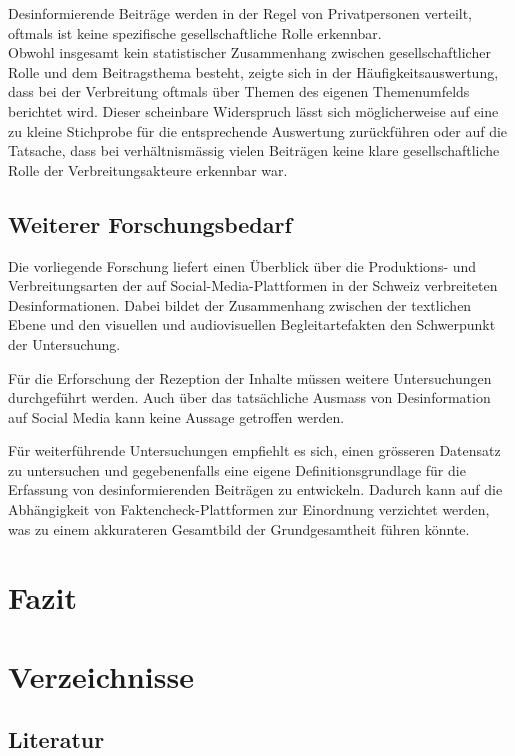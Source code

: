 \documentclass[12pt,a4paper]{article}        %
\begin{document}
Desinformierende Beiträge werden in der Regel von Privatpersonen verteilt, oftmals ist keine spezifische gesellschaftliche Rolle erkennbar. \\
Obwohl insgesamt kein statistischer Zusammenhang zwischen gesellschaftlicher Rolle und dem Beitragsthema besteht, zeigte sich in der Häufigkeitsauswertung, dass bei der Verbreitung oftmals über Themen des eigenen Themenumfelds berichtet wird. Dieser scheinbare Widerspruch lässt sich möglicherweise auf eine zu kleine Stichprobe für die entsprechende Auswertung zurückführen oder auf die Tatsache, dass bei verhältnismässig vielen Beiträgen keine klare gesellschaftliche Rolle der Verbreitungsakteure erkennbar war.

\subsection{Weiterer Forschungsbedarf}
Die vorliegende Forschung liefert einen Überblick über die Produktions- und Verbreitungsarten der auf Social-Media-Plattformen in der Schweiz verbreiteten Desinformationen. Dabei bildet der Zusammenhang zwischen der textlichen Ebene und den visuellen und audiovisuellen Begleitartefakten den Schwerpunkt der Untersuchung.

Für die Erforschung der Rezeption der Inhalte müssen weitere Untersuchungen durchgeführt werden. Auch über das tatsächliche Ausmass von Desinformation auf Social Media kann keine Aussage getroffen werden.

Für weiterführende Untersuchungen empfiehlt es sich, einen grösseren Datensatz zu untersuchen und gegebenenfalls eine eigene Definitionsgrundlage für die Erfassung von desinformierenden Beiträgen zu entwickeln. Dadurch kann auf die Abhängigkeit von Faktencheck-Plattformen zur Einordnung verzichtet werden, was zu einem akkurateren Gesamtbild der Grundgesamtheit führen könnte. 

\section{Fazit}



\pagebreak
\section{Verzeichnisse}
\subsection{Literatur}
\printbibliography[heading=none, nottype=artwork]
\end{document}
